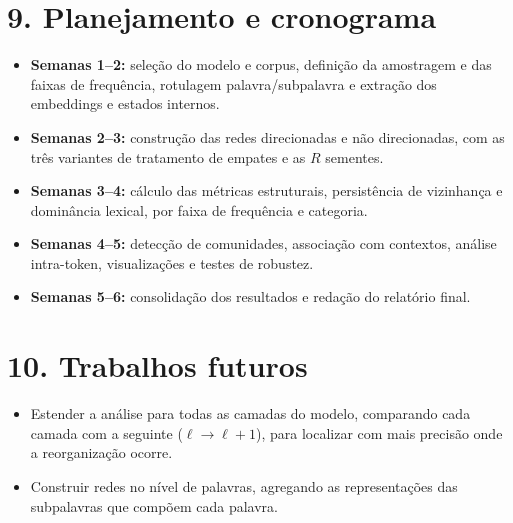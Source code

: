 \documentclass[11pt,a4paper]{article}
\begin{document}
\section*{9. Planejamento e cronograma}

\begin{itemize}

    \item \textbf{Semanas 1--2:} seleção do modelo e corpus, definição da
    amostragem e das faixas de frequência, rotulagem palavra/subpalavra e
    extração dos embeddings e estados internos.

    \item \textbf{Semanas 2--3:} construção das redes direcionadas e não
    direcionadas, com as três variantes de tratamento de empates e as $R$
    sementes.

    \item \textbf{Semanas 3--4:} cálculo das métricas estruturais, persistência
    de vizinhança e dominância lexical, por faixa de frequência e categoria.

    \item \textbf{Semanas 4--5:} detecção de comunidades, associação com
    contextos, análise intra-token, visualizações e testes de robustez.

    \item \textbf{Semanas 5--6:} consolidação dos resultados e redação do
    relatório final.

\end{itemize}

\section*{10. Trabalhos futuros}

\begin{itemize}

    \item Estender a análise para todas as camadas do modelo, comparando cada
    camada com a seguinte ($\ell\to\ell+1$), para localizar com mais precisão
    onde a reorganização ocorre.

    \item Construir redes no nível de palavras, agregando as representações
    das subpalavras que compõem cada palavra.

\end{itemize}
\end{document}
